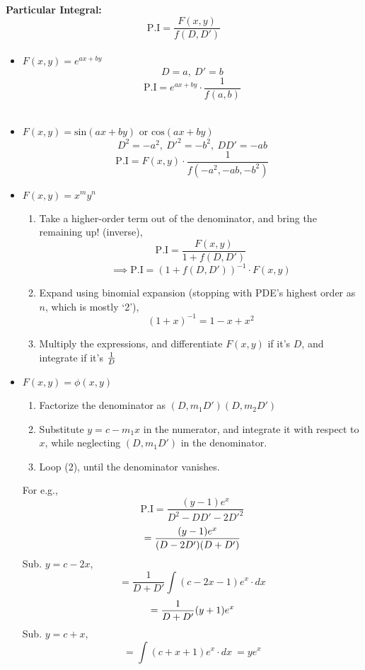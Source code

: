 \documentclass{article}
\begin{document}
{\paragraph{{\Large Particular Integral:} {\LARGE $$\mathrm{P.I}=\frac{F(x,y)}{f(D,D')}$$}}
\begin{itemize}
\item {\LARGE $F(x,y)=e^{ax+by}$}
{\LARGE $$D=a,\ D'=b$$ $$\mathrm{P.I}=e^{ax+by}\cdot \frac{1}{f(a,b)}$$} \\
\item {\LARGE $F(x,y)=\mathrm{sin}(ax+by)$} or {\LARGE $\mathrm{cos}(ax+by)$}
{\LARGE $$D^2=-a^2,\ D'^2=-b^2,\ DD'=-ab$$ $$\mathrm{P.I}=F(x,y)\cdot \frac{1}{f(-a^2,-ab,-b^2)}$$} \newpage
\item {\LARGE $F(x,y)=x^my^n$}
\begin{enumerate}[1)]
\item Take a higher-order term out of the denominator, and bring the remaining up! (inverse),
{\LARGE $$\mathrm{P.I}=\frac{F(x,y)}{1+f(D,D')}$$ $$\implies\mathrm{P.I}=(1+f(D,D'))^{-1}\cdot F(x,y)$$}
\item Expand using binomial expansion (stopping with PDE's highest order as $n$, which is mostly `2'), $$(1+x)^{-1}=1-x+x^2$$
\item Multiply the expressions, and differentiate $F(x,y)$ if it's $D$, and integrate if it's {\LARGE $1\over D$}\\
\end{enumerate}
\item {\LARGE $F(x,y)=\phi(x,y)$}
\begin{enumerate}[1)]
\item Factorize the denominator as $(D,m_1D')(D,m_2D')$
\item Substitute {\LARGE $y=c-m_1x$} in the numerator, and integrate it with respect to {\LARGE $x$}, while neglecting $(D,m_1D')$ in the denominator.
\item Loop (2), until the denominator vanishes.
\end{enumerate}
For e.g., {\LARGE $$\mathrm{P.I}=\frac{(y-1)e^x}{D^2-DD'-2D'^2}$$}
\newpage
{\LARGE $$=\frac{(y-1)e^x}{(D-2D')(D+D')}\\ $$} Sub. {\LARGE $y=c-2x$, $$=\frac{1}{D+D'}\int(c-2x-1)e^x\cdot dx$$ $$=\frac{1}{D+D'}(y+1)e^x\\ $$} Sub. {\LARGE $y=c+x$, $$=\int(c+x+1)e^x\cdot dx\ =ye^x$$}
\end{itemize}
}
\end{document}
